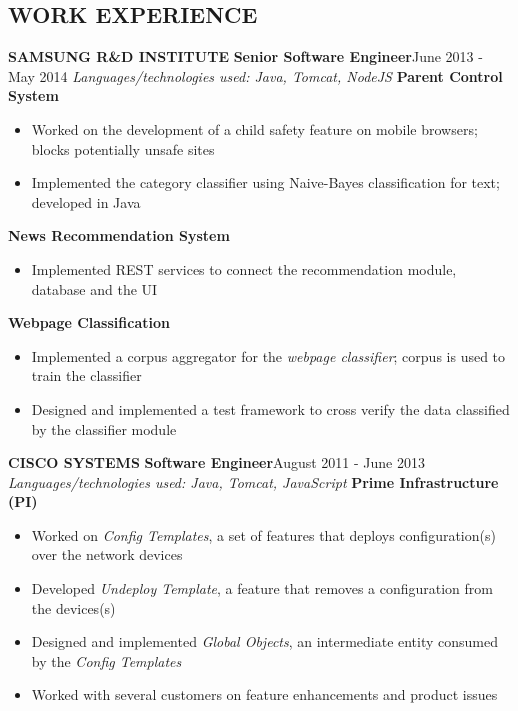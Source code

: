 \documentclass[11pt]{article}
\begin{document}
\begin{multicols}{2}
		\section*{WORK EXPERIENCE}
			\vspace{0.2cm}
			{\bfseries SAMSUNG R\&D INSTITUTE}\newline
			{\bfseries \small Senior Software Engineer}\hfill{June 2013 - May 2014}\newline
				\textit{Languages/technologies used: Java, Tomcat, NodeJS}\newline
				{\bfseries Parent Control System}
				\begin{itemize}[nolistsep,leftmargin=*]
					\item Worked on the development of a child safety feature on mobile browsers; blocks potentially unsafe sites
					\item Implemented the category classifier using Naive-Bayes classification for text; developed in Java
				\end{itemize}
				{\bfseries News Recommendation System}
				\begin{itemize}[nolistsep,leftmargin=*]
					\item Implemented REST services to connect the recommendation module, database and the UI
				\end{itemize}
				{\bfseries Webpage Classification}
				\begin{itemize}[nolistsep,leftmargin=*]
					\item Implemented a corpus aggregator for the \textit{webpage classifier}; corpus is used to train the classifier
					\item Designed and implemented a test framework to cross verify the data classified by the classifier module
				\end{itemize}
			\vspace{0.3cm}


			{\bfseries CISCO SYSTEMS}\newline
			{\bfseries \small Software Engineer}\hfill{August 2011 - June 2013}\newline			
				\textit{Languages/technologies used: Java, Tomcat, JavaScript}\newline
				{\bfseries Prime Infrastructure (PI)}
				\begin{itemize}[nolistsep,leftmargin=*]
					\item Worked on \textit{Config Templates}, a set of features that deploys configuration(s) over the network devices
					\item Developed \textit{Undeploy Template}, a feature that removes a configuration from the devices(s)
					\item Designed and implemented \textit{Global Objects}, an intermediate entity consumed by the \textit{Config Templates}
					\item Worked with several customers on feature enhancements and product issues
				\end{itemize}
			\vspace{0.3cm}
				

\end{multicols}
\end{document}
